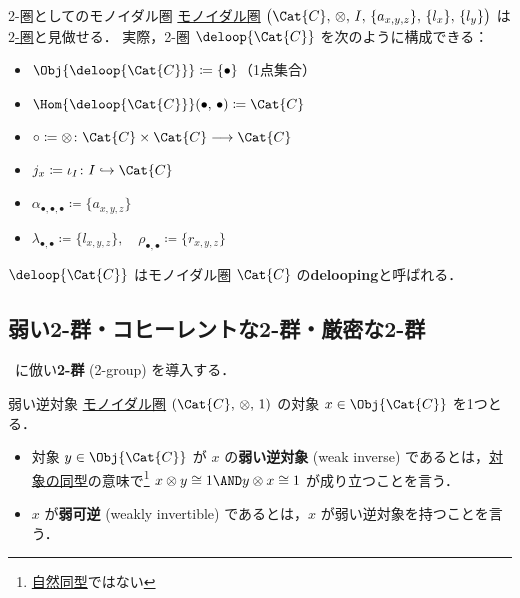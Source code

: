 \documentclass[TQFT_main]{subfiles}
\begin{document}
\begin{myexample}[label=ex:moncat2cat]{2-圏としてのモノイダル圏}
    \hyperref[redef:monoidal-category]{モノイダル圏} $\bigl(\Cat{C},\, \otimes,\, I,\, \{a_{x,y,z}\},\, \{l_x\},\, \{l_y\}\bigr)$ は\hyperref[def:2cat]{$2$-圏}と見做せる．
    実際，2-圏 $\deloop{\Cat{C}}$ を次のように構成できる：
    \begin{itemize}
        \item $\Obj{\deloop{\Cat{C}}} \coloneqq \{\bullet\}$（1点集合）
        \item $\Hom{\deloop{\Cat{C}}} (\bullet,\, \bullet) \coloneqq \Cat{C}$
        \item $\circ \coloneqq \otimes  \colon \Cat{C} \times \Cat{C} \lto \Cat{C}$
        \item $j_x \coloneqq \iota_I \colon I \hookrightarrow \Cat{C}$
        \item $\alpha_{\bullet,\bullet,\bullet} \coloneqq \{a_{x,y,z}\}$
        \item $\lambda_{\bullet,\bullet} \coloneqq \{l_{x,y,z}\},\quad \rho_{\bullet,\bullet} \coloneqq \{r_{x,y,z}\}$
    \end{itemize}
    $\deloop{\Cat{C}}$ はモノイダル圏 $\Cat{C}$ の\textbf{delooping}と呼ばれる．
\end{myexample}


\subsection{弱い2-群・コヒーレントな2-群・厳密な2-群}

~\cite{baez2004higherdimensionalalgebrav2groups}に倣い\textbf{2-群} (2-group) を導入する．

\begin{mydef}[label=def:weak-inverse]{弱い逆対象}
    \hyperref[redef:monoidal-category]{モノイダル圏} $(\Cat{C},\, \otimes ,\, 1)$ の対象 $x \in \Obj{\Cat{C}}$ を1つとる．
    
    \begin{itemize}
        \item 対象 $y \in \Obj{\Cat{C}}$ が $x$ の\textbf{弱い逆対象} (weak inverse) であるとは，\hyperref[def:iso]{対象の同型}の意味で\footnote{\hyperref[def:nat]{自然同型}ではない} $x \otimes y \cong 1 \AND y \otimes x \cong 1$ が成り立つことを言う．
        \item $x$ が\textbf{弱可逆} (weakly invertible) であるとは，$x$ が弱い逆対象を持つことを言う．
    \end{itemize}
    
\end{mydef}
\end{document}
